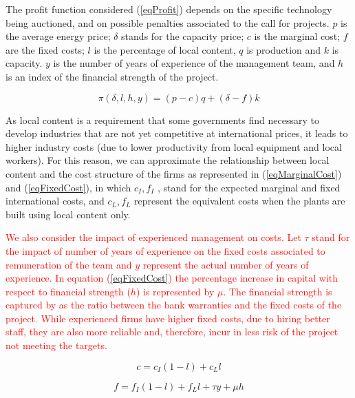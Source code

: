 \documentclass[informs]{informs3}
\begin{document}
The profit function considered (\ref{eqProfit}) depends on the specific technology being auctioned, and on possible penalties associated to the call for projects. $p$ is the average energy price; $\delta$ stands for the capacity price; $c$  is the marginal cost;  $f$  are the fixed costs; $l$  is the percentage of local content, $q$ is production and $k$ is capacity. $y$ is the number of years of experience of the management team, and $h$ is an index of the financial strength of the project.


\begin{equation} \label{eqProfit}
\pi(\delta,l,h,y) = (p-c)q+(\delta-f)k
\end{equation}


As local content is a requirement that some governments find necessary to develop industries that are not yet competitive at international prices, it leads to higher industry costs (due to lower productivity from local equipment and local workers). For this reason, we can approximate the relationship between local content and the cost structure of the firms as represented in (\ref{eqMarginalCost}) and (\ref{eqFixedCost}), in which $c_I, f_I$ , stand for the expected marginal and fixed international costs, and $c_L, f_L$  represent the equivalent costs when the plants are built using local content only. 

\textcolor{red}{We also consider the impact of experienced management on costs. Let $\tau$  stand for the impact of number of years of experience on the fixed costs associated to remuneration of the team and $y$ represent the actual number of years of experience. In equation (\ref{eqFixedCost}) the percentage increase in capital with respect to financial strength ($h$) is represented by $\mu$. The financial strength is captured by as the ratio between the bank warranties and the fixed costs of the project. While experienced firms have higher fixed costs, due to hiring better staff, they are also more reliable and, therefore, incur in less risk of the project not meeting the targets.}  


\begin{equation} \label{eqMarginalCost}
c = c_I(1-l)+c_Ll
\end{equation}

\begin{equation} \label{eqFixedCost}
f = f_I(1-l)+f_Ll+\tau y+\mu h
\end{equation}
\end{document}
